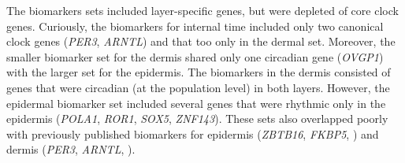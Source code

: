 The biomarkers sets included layer-specific genes, but were depleted of core clock genes. Curiously, the biomarkers for internal time included only two canonical clock genes (\textit{PER3}, \textit{ARNTL}) and that too only in the dermal set. Moreover, the smaller biomarker set for the dermis shared only one circadian gene (\textit{OVGP1}) with the larger set for the epidermis. The biomarkers in the dermis consisted of genes that were circadian (at the population level) in both layers. However, the epidermal biomarker set included several genes that were rhythmic only in the epidermis (\textit{POLA1}, \textit{ROR1}, \textit{SOX5}, \textit{ZNF143}). These sets also overlapped poorly with previously published biomarkers for epidermis (\textit{ZBTB16}, \textit{FKBP5}, \cite{Wu2018}) and dermis (\textit{PER3}, \textit{ARNTL}, \cite{Wu2020}). 





